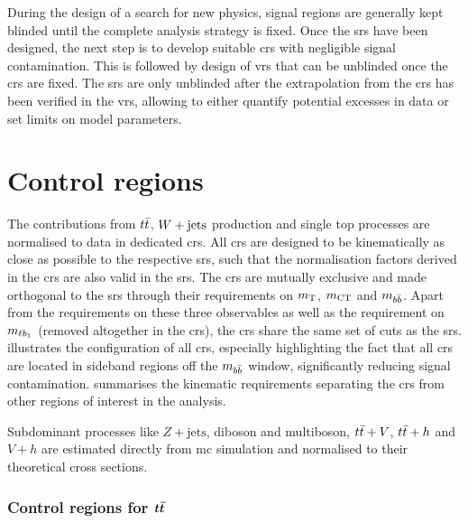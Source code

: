 During the design of a search for new physics, signal regions are generally kept blinded until the complete analysis strategy is fixed. Once the \glspl{sr} have been designed, the next step is to develop suitable \glspl{cr} with negligible signal contamination. This is followed by design of \glspl{vr} that can be unblinded once the \glspl{cr} are fixed. The \glspl{sr} are only unblinded after the extrapolation from the \glspl{cr} has been verified in the \glspl{vr}, allowing to either quantify potential excesses in data or set limits on model parameters. 

\section{Control regions}

The contributions from $\ttbar$, $W+\mathrm{jets}$ production and single top processes are normalised to data in dedicated \glspl{cr}. All \glspl{cr} are designed to be kinematically as close as possible to the respective \glspl{sr}, such that the normalisation factors derived in the \glspl{cr} are also valid in the \glspl{sr}. The \glspl{cr} are mutually exclusive and made orthogonal to the \glspl{sr} through their requirements on $m_{\textrm{T}}$, $m_{\textrm{CT}}$ and $m_{b\bar{b}}$. Apart from the requirements on these three observables as well as the requirement on $m_{\ell b_{1}}$ (removed altogether in the \glspl{cr}), the \glspl{cr} share the same set of cuts as the \glspl{sr}.  illustrates the configuration of all \glspl{cr}, especially highlighting the fact that all \glspl{cr} are located in sideband regions off the $m_{b\bar{b}}$ window, significantly reducing signal contamination.  summarises the kinematic requirements separating the \glspl{cr} from other regions of interest in the analysis. 

Subdominant processes like $Z+\mathrm{jets}$, diboson and multiboson, $t\bar{t}+V$, $t\bar{t}+h$ and $V+h$ are estimated directly from \gls{mc} simulation and normalised to their theoretical cross sections. 

\subsubsection[Control regions for $\ttbar$]{Control regions for $\boldsymbol{t\bar{t}}$}

